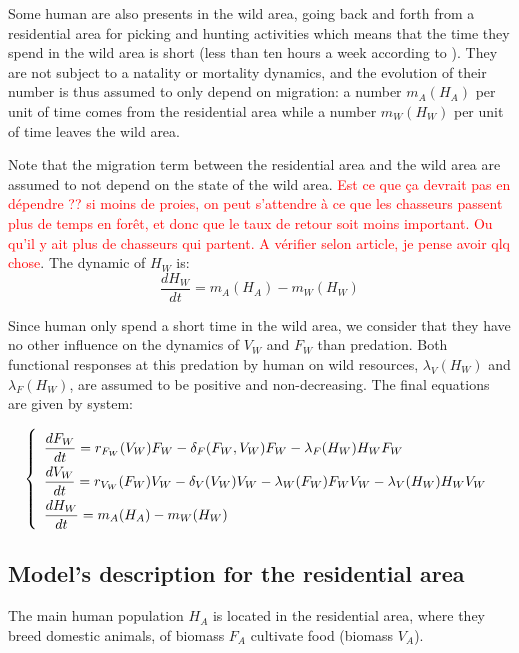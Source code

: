 \documentclass{article}
\newcommand{\lfw}{\lambda_{F}}
\newcommand{\lvw}{\lambda_{V}}
\newcommand{\lfv}{\lambda_{W}}
\newcommand{\marc}[1]{\textcolor{red}{#1}}
\begin{document}
\bigskip
Some human are also presents in the wild area, going back and forth from a residential area for picking and hunting activities which means that the time they spend in the wild area is short (less than ten hours a week according to \cite{avila_interpreting_2019}). They are not subject to a natality or mortality dynamics, and the evolution of their number is thus assumed to only depend on migration: a number $m_A(H_A)$ per unit of time comes from the residential area while a number $m_W(H_W)$  per unit of time leaves the wild area.

Note that the migration term between the residential area and the wild area are assumed to not depend on the state of the wild area. \marc{Est ce que ça devrait pas en dépendre ?? si moins de proies, on peut s'attendre à ce que les chasseurs passent plus de temps en forêt, et donc que le taux de retour soit moins important. Ou qu'il y ait plus de chasseurs qui partent. A vérifier selon article, je pense avoir qlq chose}.
The dynamic of $H_W$ is:
\begin{equation*}
\dfrac{dH_W}{dt} = m_A(H_A) - m_W(H_W)
\end{equation*}

Since human only spend a short time in the wild area, we consider that they have no other influence on the dynamics of $V_W$ and $F_W$ than predation. Both functional responses at this predation by human on wild resources, $\lvw(H_W)$ and $\lfw(H_W)$, are assumed to be positive and non-decreasing. The final equations are given by system:

\begin{equation*}
\def\arraystretch{2}
\left\lbrace \begin{array}{l}
\dfrac{dF_W}{dt} = r_{F_W}(V_W) F_W - \delta_F(F_W, V_W) F_W - \lfw(H_W)H_WF_W\\
\dfrac{dV_W}{dt} = r_{V_W}(F_W) V_W - \delta_V(V_W) V_W - \lfv(F_W)F_W V_W - \lvw(H_W)H_W V_W \\
\dfrac{dH_W}{dt} = m_A(H_A) - m_W(H_W)
\end{array} \right.
\end{equation*}

\subsection{Model's description for the residential area}

The main human population $H_A$ is located in the residential area, where they breed domestic animals, of biomass $F_A$ cultivate food (biomass $V_A$).
\end{document}
